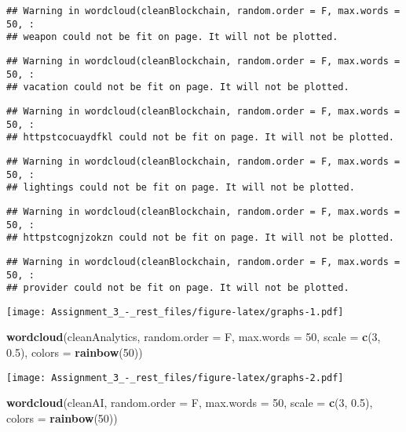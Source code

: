 \documentclass[]{article}
\newenvironment{Shaded}{\begin{snugshade}}{\end{snugshade}}
\newcommand{\KeywordTok}[1]{\textcolor[rgb]{0.13,0.29,0.53}{\textbf{#1}}}
\newcommand{\DataTypeTok}[1]{\textcolor[rgb]{0.13,0.29,0.53}{#1}}
\newcommand{\DecValTok}[1]{\textcolor[rgb]{0.00,0.00,0.81}{#1}}
\newcommand{\FloatTok}[1]{\textcolor[rgb]{0.00,0.00,0.81}{#1}}
\newcommand{\NormalTok}[1]{#1}
\begin{document}
\begin{verbatim}
## Warning in wordcloud(cleanBlockchain, random.order = F, max.words = 50, :
## weapon could not be fit on page. It will not be plotted.
\end{verbatim}

\begin{verbatim}
## Warning in wordcloud(cleanBlockchain, random.order = F, max.words = 50, :
## vacation could not be fit on page. It will not be plotted.
\end{verbatim}

\begin{verbatim}
## Warning in wordcloud(cleanBlockchain, random.order = F, max.words = 50, :
## httpstcocuaydfkl could not be fit on page. It will not be plotted.
\end{verbatim}

\begin{verbatim}
## Warning in wordcloud(cleanBlockchain, random.order = F, max.words = 50, :
## lightings could not be fit on page. It will not be plotted.
\end{verbatim}

\begin{verbatim}
## Warning in wordcloud(cleanBlockchain, random.order = F, max.words = 50, :
## httpstcognjzokzn could not be fit on page. It will not be plotted.
\end{verbatim}

\begin{verbatim}
## Warning in wordcloud(cleanBlockchain, random.order = F, max.words = 50, :
## provider could not be fit on page. It will not be plotted.
\end{verbatim}

\texttt{[image: Assignment\_3\_-\_rest\_files/figure-latex/graphs-1.pdf]}

\begin{Shaded}
\begin{Highlighting}[]
\KeywordTok{wordcloud}\NormalTok{(cleanAnalytics, }\DataTypeTok{random.order =}\NormalTok{ F, }\DataTypeTok{max.words =} \DecValTok{50}\NormalTok{, }\DataTypeTok{scale =} \KeywordTok{c}\NormalTok{(}\DecValTok{3}\NormalTok{, }\FloatTok{0.5}\NormalTok{), }\DataTypeTok{colors =} \KeywordTok{rainbow}\NormalTok{(}\DecValTok{50}\NormalTok{))}
\end{Highlighting}
\end{Shaded}

\texttt{[image: Assignment\_3\_-\_rest\_files/figure-latex/graphs-2.pdf]}

\begin{Shaded}
\begin{Highlighting}[]
\KeywordTok{wordcloud}\NormalTok{(cleanAI, }\DataTypeTok{random.order =}\NormalTok{ F, }\DataTypeTok{max.words =} \DecValTok{50}\NormalTok{, }\DataTypeTok{scale =} \KeywordTok{c}\NormalTok{(}\DecValTok{3}\NormalTok{, }\FloatTok{0.5}\NormalTok{), }\DataTypeTok{colors =} \KeywordTok{rainbow}\NormalTok{(}\DecValTok{50}\NormalTok{))}
\end{Highlighting}
\end{Shaded}
\end{document}
